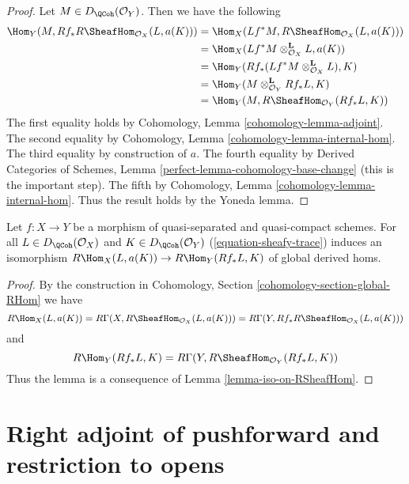 \begin{proof}
Let $M \in D_\QCoh(\mathcal{O}_Y)$. Then we have the following
\begin{align*}
\Hom_Y(M, Rf_*R\SheafHom_{\mathcal{O}_X}(L, a(K)))
& =
\Hom_X(Lf^*M, R\SheafHom_{\mathcal{O}_X}(L, a(K))) \\
& =
\Hom_X(Lf^*M \otimes_{\mathcal{O}_X}^\mathbf{L} L, a(K)) \\
& =
\Hom_Y(Rf_*(Lf^*M \otimes_{\mathcal{O}_X}^\mathbf{L} L), K) \\
& =
\Hom_Y(M \otimes_{\mathcal{O}_Y}^\mathbf{L} Rf_*L, K) \\
& =
\Hom_Y(M, R\SheafHom_{\mathcal{O}_Y}(Rf_*L, K))
\end{align*}
The first equality holds by Cohomology, Lemma \ref{cohomology-lemma-adjoint}.
The second equality by Cohomology, Lemma \ref{cohomology-lemma-internal-hom}.
The third equality by construction of $a$.
The fourth equality by Derived Categories of Schemes, Lemma
\ref{perfect-lemma-cohomology-base-change} (this is the important step).
The fifth by Cohomology, Lemma \ref{cohomology-lemma-internal-hom}.
Thus the result holds by the Yoneda lemma.
\end{proof}

\begin{lemma}
\label{lemma-iso-global-hom}
Let $f : X \to Y$ be a morphism of quasi-separated and quasi-compact
schemes.
For all $L \in D_\QCoh(\mathcal{O}_X)$ and $K \in D_\QCoh(\mathcal{O}_Y)$
(\ref{equation-sheafy-trace}) induces an isomorphism
$R\Hom_X(L, a(K)) \to R\Hom_Y(Rf_*L, K)$ of global derived homs.
\end{lemma}

\begin{proof}
By the construction in
Cohomology, Section \ref{cohomology-section-global-RHom}
we have
$$
R\Hom_X(L, a(K)) =
R\Gamma(X, R\SheafHom_{\mathcal{O}_X}(L, a(K))) =
R\Gamma(Y, Rf_*R\SheafHom_{\mathcal{O}_X}(L, a(K)))
$$
and
$$
R\Hom_Y(Rf_*L, K) = R\Gamma(Y, R\SheafHom_{\mathcal{O}_Y}(Rf_*L, K))
$$
Thus the lemma is a consequence of Lemma \ref{lemma-iso-on-RSheafHom}.
\end{proof}







\section{Right adjoint of pushforward and restriction to opens}
\label{section-restriction-to-opens}

